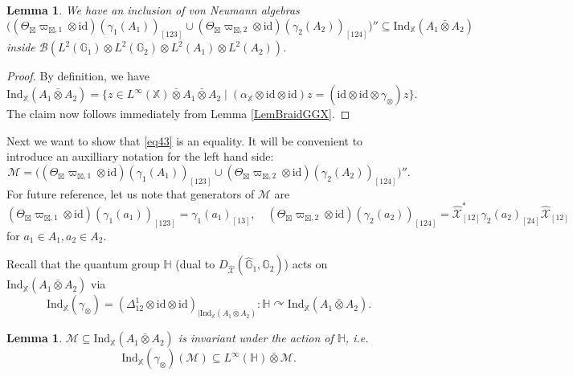 \documentclass[reqno]{amsart}
\numberwithin{equation}{section}
\newtheorem{Lem}[Theorem]{Lemma}
\newcommand{\mcB}{\mathcal{B}}
\newcommand{\id}{\mathrm{id}}
\newcommand{\G}{\mathbb{G}}
\newcommand{\X}{\mathbb{X}}
\newcommand{\Ind}{\mathrm{Ind}}
\newcommand{\mc}{\mathcal}
\newcommand{\wh}{\widehat}
\newcommand{\HH}{\mathbb{H}}
\newcommand{\GG}{\mathbb{G}}
\begin{document}
\begin{Lem}\label{lemma12}
We have an inclusion of von Neumann algebras 
\begin{equation}\label{eq43}
\bigl((\Theta_{\boxtimes}\varpi_{\boxtimes,1}\otimes \id)(\gamma_1(A_1))_{[123]} \cup (\Theta_{\boxtimes}\varpi_{\boxtimes,2} \otimes \id)(\gamma_2(A_2))_{[124]}\bigr)''\subseteq
\Ind_{\X}(A_1\bar{\otimes} A_2)
\end{equation}
inside $\mcB(L^2(\G_1)\otimes L^2(\G_2)\otimes L^2(A_1)\otimes L^2(A_2))$.
\end{Lem} 

\begin{proof}
By definition, we have 
\begin{equation}\label{EqInductionFromX}
\Ind_{\X}(A_1\bar{\otimes}A_2) = \{z\in L^{\infty}(\X) \bar{\otimes} A_1 \bar{\otimes}A_2 \mid (\alpha_{\X}\otimes \id\otimes \id)z = (\id\otimes\id\otimes \gamma_{\otimes})z\}.
\end{equation}
The claim now  follows immediately from Lemma \ref{LemBraidGGX}.
\end{proof} 

Next we want to show that \eqref{eq43} is an equality. It will be convenient to introduce an auxilliary notation for the left hand side:
\begin{equation}\label{eq45}
\mc{M}=\bigl((\Theta_{\boxtimes}\varpi_{\boxtimes,1}\otimes \id)(\gamma_1(A_1))_{[123]} \cup (\Theta_{\boxtimes}\varpi_{\boxtimes,2} \otimes \id)(\gamma_2(A_2))_{[124]}\bigr)''.
\end{equation}
For future reference, let us note that generators of $\mc{M}$ are 
\begin{equation}\label{eq46}
 (\Theta_{\boxtimes}\varpi_{\boxtimes,1}\otimes \id)(\gamma_1(a_1))_{[123]}=\gamma_1(a_1)_{[13]},
 \quad 
 (\Theta_{\boxtimes}\varpi_{\boxtimes,2}\otimes \id)(\gamma_2(a_2))_{[124]}=
\wh{\mc{X}}^*_{[12]}\gamma_2(a_2)_{[24]}
\wh{\mc{X}}_{[12]}
\end{equation}
for $a_1\in A_1,a_2\in A_2$.

Recall that the quantum group $\HH$ (dual to $D_{\wh{\mc{X}}}(\wh{\GG}_1,\wh{\GG}_2)$) acts on $\Ind_{\X}(A_1\bar\otimes A_2)$ via
\[
\Ind_{\X}(\gamma_\otimes)=(\Delta_{12}^1\otimes \id\otimes \id)_{\mid \Ind_{\X}(A_1\bar\otimes A_2)}
\colon \HH\curvearrowright \Ind_{\X}(A_1\bar\otimes A_2).
\]

\begin{Lem}\label{lemma13}
$\mc{M}\subseteq \Ind_{\X}(A_1\bar\otimes A_2)$ is invariant under the action of $\HH$, i.e.
\[
\Ind_{\X}(\gamma_\otimes) (\mc{M})\subseteq 
L^{\infty}(\HH)\bar\otimes \mc{M}.
\]
\end{Lem}
\end{document}
